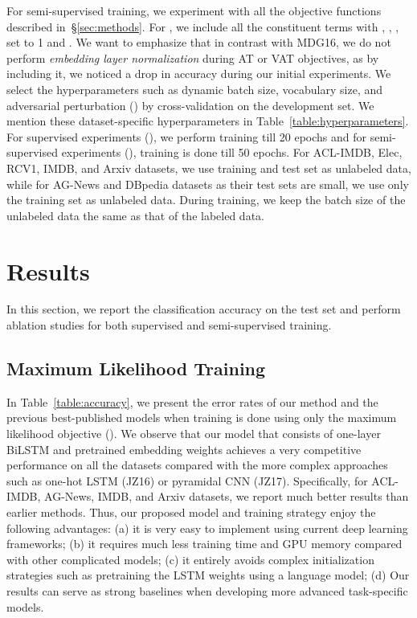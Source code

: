 \documentclass[letterpaper]{article}
\begin{document}
For semi-supervised training, we experiment with all the objective functions described in~\S\ref{sec:methods}. For , we include all the constituent terms with , , ,  set to 1 and . We want to emphasize that in contrast with MDG16, we do not perform \emph{embedding layer normalization} during AT or VAT objectives, as by including it, we noticed a drop in accuracy during our initial experiments. We select the hyperparameters such as dynamic batch size, vocabulary size, and adversarial perturbation () by cross-validation on the development set. We mention these dataset-specific hyperparameters in Table~\ref{table:hyperparameters}. For supervised experiments (), we perform training till 20 epochs and for semi-supervised experiments (), training is done till 50 epochs. For ACL-IMDB, Elec, RCV1, IMDB, and Arxiv datasets, we use training and test set as unlabeled data, while for AG-News and DBpedia datasets as their test sets are small, we use only the training set as unlabeled data. During training, we keep the batch size of the unlabeled data the same as that of the labeled data.

\section{Results}
\label{sec:results}
In this section, we report the classification accuracy on the test set and perform ablation studies for both supervised and semi-supervised training.

\subsection{Maximum Likelihood Training}
In Table~\ref{table:accuracy}, we present the error rates of our method and the previous best-published models when training is done using only the maximum likelihood objective (). We observe that our model that consists of one-layer BiLSTM and pretrained embedding weights achieves a very competitive performance on all the datasets compared with the more complex approaches such as one-hot LSTM (JZ16) or pyramidal CNN (JZ17). Specifically, for ACL-IMDB, AG-News, IMDB, and Arxiv datasets, we report much better results than earlier methods. Thus, our proposed model and training strategy enjoy the following advantages: (a) it is very easy to implement using current deep learning frameworks; (b) it requires much less training time and GPU memory compared with other complicated models; (c) it entirely avoids complex initialization strategies such as pretraining the LSTM weights using a language model; (d) Our results can serve as strong baselines when developing more advanced task-specific models.
\end{document}
